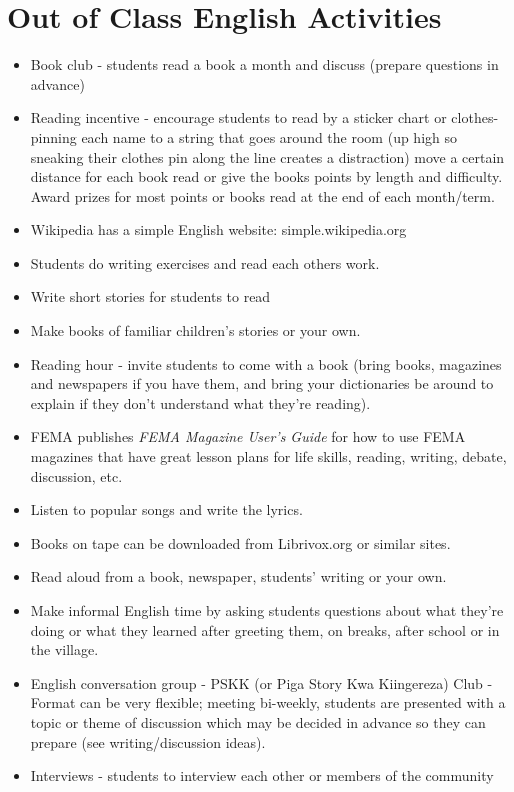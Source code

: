 \section{Out of Class English Activities}
\begin{itemize}
\item Book club - students read a book a month and discuss (prepare questions
in advance)  
\item Reading incentive - encourage students to read by a sticker chart
or clothes-pinning each name to a string that goes around the room
(up high so sneaking their clothes pin along the line creates a distraction)
move a certain distance for each book read or give the books points
by length and difficulty. Award prizes for most points or books read
at the end of each month/term. 
\item Wikipedia has a simple English website: simple.wikipedia.org  
\item Students do writing exercises and read each others work. 
\item Write short stories for students to read 
\item Make books of familiar children's stories or your own.  
\item Reading hour - invite students to come with a book (bring books, magazines
and newspapers if you have them, and bring your dictionaries be around
to explain if they don't understand what they're reading).  
\item FEMA publishes \textit{FEMA Magazine User's Guide } for how to use
FEMA magazines that have great lesson plans for life skills, reading,
writing, debate, discussion, etc. 
\item Listen to popular songs and write the lyrics.  
\item Books on tape can be downloaded from Librivox.org or similar sites. 
\item Read aloud from a book, newspaper, students' writing or your own. 
\item Make informal English time by asking students questions about what
they're doing or what they learned after greeting them, on breaks,
after school or in the village. 
\item English conversation group - PSKK (or Piga Story Kwa Kiingereza) Club
- Format can be very flexible; meeting bi-weekly, students are presented
with a topic or theme of discussion which may be decided in advance
so they can prepare (see writing/discussion ideas). 
\item Interviews - students to interview each other or members of the community

\end{itemize}
